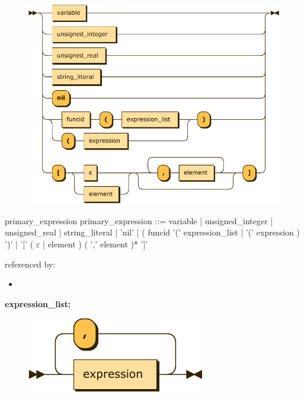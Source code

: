 \documentclass[10pt,a4paper,twoside]{article}
\providecommand{\tightlist}{%
  \setlength{\itemsep}{0pt}\setlength{\parskip}{0pt}}
\newcounter{grammarbox}[section]
\begin{document}
\begin{figure}[H]
\centering
\includegraphics{diagram/primary_expression.pdf}

\end{figure}

\begin{grammarbox}{primary\_expression}
\vspace{0.5em}
primary\_expression
         ::= variable
           | unsigned\_integer
           | unsigned\_real
           | string\_literal
           | 'nil'
           | ( funcid '(' expression\_list | '(' expression ) ')'
           | '[' ( $\varepsilon$ | element ) ( ',' element )* ']'
\end{grammarbox}

referenced by:

\begin{itemize}
\tightlist
\item
\end{itemize}

\textbf{expression\_list:}

\begin{figure}[H]
\centering
\includegraphics{diagram/expression_list.pdf}

\end{figure}
\end{document}
